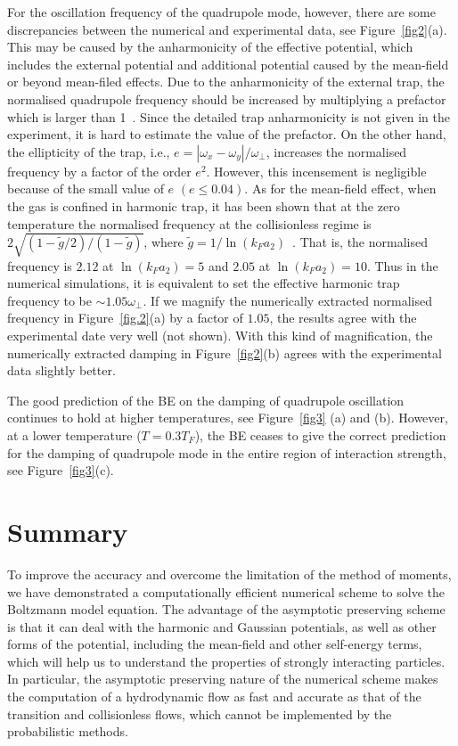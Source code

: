 For the oscillation frequency of the quadrupole mode, however, there are some discrepancies between the numerical and experimental data, see Figure~\ref{fig2}(a). This may be caused by the anharmonicity of the effective potential, which includes the external potential and additional potential caused by the mean-field or beyond mean-filed effects. Due to the anharmonicity of the external trap, the normalised quadrupole frequency should be increased by multiplying a prefactor which is larger than 1~\cite{Altmeyer2007}. Since the detailed trap anharmonicity is not given in the experiment, it is hard to estimate the value of the prefactor. On the other hand, the ellipticity of the trap, i.e., $e=|\omega_x-\omega_y|/\omega_\bot$, increases the normalised frequency by a factor of the order $e^2$. However, this incensement is negligible because of the small value of $e$ $(e\le0.04)$. As for the mean-field effect, when the gas is confined in harmonic trap, it has been shown that at the zero temperature the normalised frequency at the collisionless regime is $2\sqrt{(1-\widetilde{g}/2)/(1-\widetilde{g})}$, where $\widetilde{g}=1/\ln(k_Fa_{2})$~\cite{Ghosh2002,Vogt2012}. That is, the normalised frequency is $2.12$ at $\ln(k_Fa_{2})=5$ and $2.05$ at $\ln(k_Fa_{2})=10$. Thus in the numerical simulations, it is equivalent to set the effective harmonic trap frequency to be $\sim1.05\omega_\bot$. If we magnify the numerically extracted normalised frequency in Figure~\ref{fig.2}(a) by a factor of $1.05$, the results agree with the experimental date very well (not shown). With this kind of magnification, the numerically extracted damping in Figure~\ref{fig2}(b) agrees with the experimental data slightly better.


The good prediction of the BE on the damping of quadrupole oscillation continues to hold at higher temperatures, see Figure~\ref{fig3} (a) and (b). However, at a lower temperature ($T=0.3T_F$), the BE ceases to give the correct prediction for the damping of quadrupole mode in the entire region of interaction strength, see Figure~\ref{fig3}(c).




\section{Summary}


To improve the accuracy and overcome the limitation of the method of moments, we have demonstrated a computationally efficient numerical scheme to solve the Boltzmann model equation. The advantage of the asymptotic preserving scheme is that it can deal with the harmonic and Gaussian potentials, as well as other forms of the potential, including the mean-field and other self-energy terms, which will help us to understand the properties of strongly interacting particles. In particular, the asymptotic preserving nature of the numerical scheme makes the computation of a hydrodynamic flow as fast and accurate as that of the transition and collisionless flows, which cannot be implemented by the probabilistic methods.



